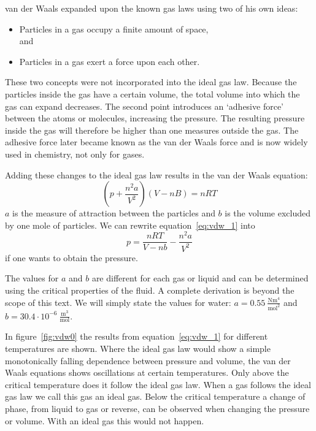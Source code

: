 van der Waals expanded upon the known gas laws using two of his own ideas:
\begin{itemize}
\item Particles in a gas occupy a finite amount of space,\\
and
\item Particles in a gas exert a force upon each other.
\end{itemize}
These two concepts were not incorporated into the ideal gas law. Because the particles inside the gas have a certain volume, the total volume into which the gas can expand decreases. The second point introduces an `adhesive force' between the atoms or molecules, increasing the pressure. The resulting pressure inside the gas will therefore be higher than one measures outside the gas. The adhesive force later became known as the van der Waals force and is now widely used in chemistry, not only for gases.

Adding these changes to the ideal gas law results in the van der Waals equation:
\begin{equation}
\left( p+ \frac{n^{2} a}{V^2} \right) \left( V -nB \right)  = nRT \label{eq:vdw_1}
\end{equation}
$a$ is the measure of attraction between the particles and $b$ is the volume excluded by one mole of particles. We can rewrite equation~\ref{eq:vdw_1} into
\begin{equation}
p=\frac{nRT}{V-nb}-\frac{n^{2}a}{V^2}
\end{equation}
if one wants to obtain the pressure.

The values for $a$ and $b$ are different for each gas or liquid and can be determined using the critical properties of the fluid. A complete derivation is beyond the scope of this text. We will simply state the values for water: $a=0.55~\frac{\mbox{Nm}^4}{\mbox{mol}^2}$ and $b=30.4 \cdot 10^{-6}~\frac{\mbox{m}^3}{\mbox{mol}}$.

In figure~\ref{fig:vdw0} the results from equation~\ref{eq:vdw_1} for different temperatures are shown. Where the ideal gas law would show a simple monotonically falling dependence between pressure and volume, the van der Waals equations shows oscillations at certain temperatures. Only above the critical temperature does it follow the ideal gas law. When a gas follows the ideal gas law we call this gas an ideal gas. Below the critical temperature a change of phase, from liquid to gas or reverse, can be observed when changing the pressure or volume. With an ideal gas this would not happen.

